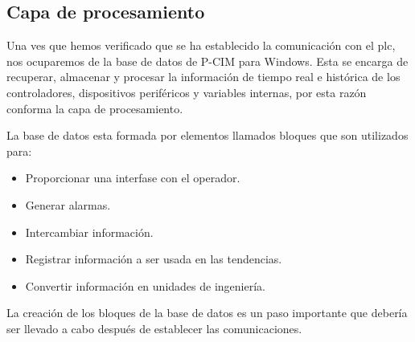\subsection{Capa de procesamiento}
\label{subsec:CapaProcesamiento}
Una ves que hemos verificado que se ha establecido la comunicación con el \gls{plc}, 
nos ocuparemos de la base de datos de P-CIM para Windows. Esta se encarga de recuperar, 
almacenar y procesar la información de tiempo real e histórica de los controladores, 
dispositivos periféricos y variables internas, por esta razón conforma la capa de 
procesamiento.

La base de datos esta formada por elementos llamados bloques que son utilizados para:
\begin{itemize}
 \item Proporcionar una interfase con el operador.
 \item Generar alarmas.
 \item Intercambiar información.
 \item Registrar información a ser usada en las tendencias.
 \item Convertir información en unidades de ingeniería.
\end{itemize}
La creación de los bloques de la base de datos es un paso importante que debería
ser llevado a cabo después de establecer las comunicaciones.


